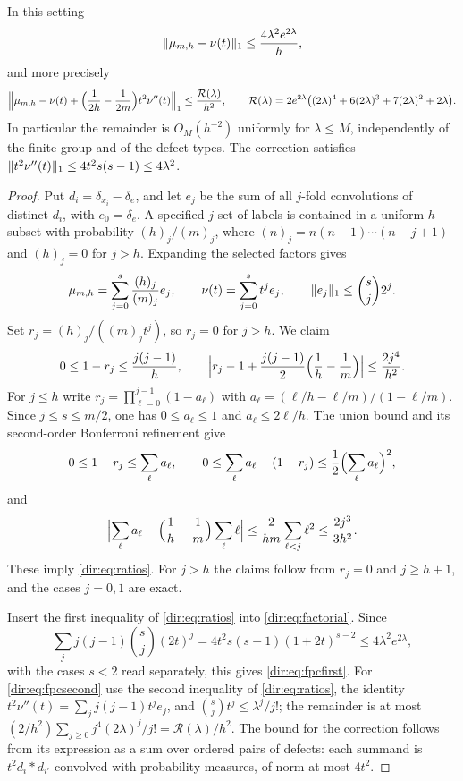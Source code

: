 \begin{theorem}\label{dir:thm:fpc}
In this setting
\begin{equation}\label{dir:eq:fpcfirst}
 \lVert\mu_{m,h}-\nu(t)\rVert_1\le\frac{4\lambda^2e^{2\lambda}}h ,
\end{equation}
and more precisely
\begin{equation}\label{dir:eq:fpcsecond}
 \Bigl\|\mu_{m,h}-\nu(t)+\Bigl(\frac1{2h}-\frac1{2m}\Bigr)t^2\nu''(t)\Bigr\|_1\le\frac{\mathcal R(\lambda)}{h^2},
 \qquad
 \mathcal R(\lambda)=2e^{2\lambda}\bigl((2\lambda)^4+6(2\lambda)^3+7(2\lambda)^2+2\lambda\bigr).
\end{equation}
In particular the remainder is $O_M(h^{-2})$ uniformly for $\lambda\le M$, independently of the finite
group and of the defect types. The correction satisfies $\lVert t^2\nu''(t)\rVert_1\le4t^2s(s-1)\le4\lambda^2$.
\end{theorem}

\begin{proof}
Put $d_i=\delta_{x_i}-\delta_e$, and let $e_j$ be the sum of all $j$-fold convolutions of distinct
$d_i$, with $e_0=\delta_e$. A specified $j$-set of labels is contained in a uniform $h$-subset with
probability $(h)_j/(m)_j$, where $(n)_j=n(n-1)\cdots(n-j+1)$ and $(h)_j=0$ for $j>h$. Expanding the
selected factors gives
\begin{equation}\label{dir:eq:factorial}
 \mu_{m,h}=\sum_{j=0}^s\frac{(h)_j}{(m)_j}e_j,\qquad\nu(t)=\sum_{j=0}^st^je_j,\qquad
 \lVert e_j\rVert_1\le\binom sj2^j .
\end{equation}
Set $r_j=(h)_j/((m)_jt^j)$, so $r_j=0$ for $j>h$. We claim
\begin{equation}\label{dir:eq:ratios}
 0\le1-r_j\le\frac{j(j-1)}h,\qquad
 \Bigl|r_j-1+\frac{j(j-1)}2\Bigl(\frac1h-\frac1m\Bigr)\Bigr|\le\frac{2j^4}{h^2}.
\end{equation}
For $j\le h$ write $r_j=\prod_{\ell=0}^{j-1}(1-a_\ell)$ with $a_\ell=(\ell/h-\ell/m)/(1-\ell/m)$. Since
$j\le s\le m/2$, one has $0\le a_\ell\le1$ and $a_\ell\le2\ell/h$. The union bound and its second-order
Bonferroni refinement give
\[
 0\le1-r_j\le\sum_\ell a_\ell,\qquad0\le\sum_\ell a_\ell-(1-r_j)\le\frac12\Bigl(\sum_\ell a_\ell\Bigr)^2,
\]
and
\[
 \Bigl|\sum_\ell a_\ell-\Bigl(\frac1h-\frac1m\Bigr)\sum_\ell\ell\Bigr|\le\frac2{hm}\sum_{\ell<j}\ell^2
 \le\frac{2j^3}{3h^2}.
\]
These imply \eqref{dir:eq:ratios}. For $j>h$ the claims follow from $r_j=0$ and $j\ge h+1$, and the cases
$j=0,1$ are exact.

Insert the first inequality of \eqref{dir:eq:ratios} into \eqref{dir:eq:factorial}. Since
\[
 \sum_jj(j-1)\binom sj(2t)^j=4t^2s(s-1)(1+2t)^{s-2}\le4\lambda^2e^{2\lambda},
\]
with the cases $s<2$ read separately, this gives \eqref{dir:eq:fpcfirst}. For \eqref{dir:eq:fpcsecond}
use the second inequality of \eqref{dir:eq:ratios}, the identity $t^2\nu''(t)=\sum_jj(j-1)t^je_j$, and
$\binom sjt^j\le\lambda^j/j!$; the remainder is at most
$(2/h^2)\sum_{j\ge0}j^4(2\lambda)^j/j!=\mathcal R(\lambda)/h^2$. The bound for the correction follows from
its expression as a sum over ordered pairs of defects: each summand is
$t^2d_i*d_{i'}$ convolved with probability measures, of norm at most $4t^2$.
\end{proof}

